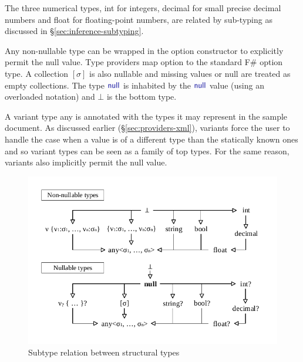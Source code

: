\documentclass[10pt,preprint,blind,clearpagebib]{sigplanconf}
\newcommand{\kvd}[1]{\textnormal{\textcolor{kvdclr}{\sffamily #1}}}
\newcommand{\ident}[1]{\textnormal{\sffamily #1}}
\begin{document}
The three numerical types, \ident{int} for integers, \ident{decimal} for small precise decimal 
numbers and \ident{float} for floating-point numbers, are related by sub-typing as discussed in 
\S\ref{sec:inference-subtyping}.

Any non-nullable type can be wrapped in the \kvd{option} constructor to explicitly permit the 
\kvd{null} value. Type providers map \kvd{option} to the standard F\# option type. A collection $[\sigma]$ 
is also nullable and missing values or \kvd{null} are treated as empty collections. The type 
$\kvd{null}$ is inhabited by the $\kvd{null}$ value (using an overloaded notation) and $\bot$ 
is the bottom type.

A variant type \kvd{any} is annotated with the types it may represent in the sample document.
As discussed earlier (\S\ref{sec:providers-xml}), variants force the user to handle the case when 
a value is of a different type than the statically known ones and so variant types can be seen as a family of 
top types. For the same reason, variants also implicitly permit the \kvd{null} value. 


\begin{figure}
\begin{center}
\includegraphics[scale=0.80,trim=5mm 5mm 5mm 5mm,clip]{images/hierarchy.pdf} %
\end{center}
\vspace{-0.5em}
\caption{Subtype relation between structural types}
\label{fig:subtyping-diagram}
\vspace{-0.5em}
\end{figure}
\end{document}
